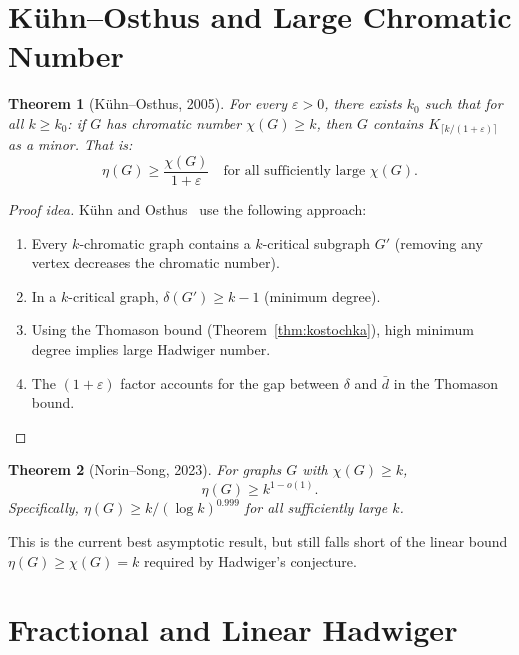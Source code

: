 \documentclass[12pt,a4paper]{amsart}
\newtheorem{theorem}{Theorem}[section]
\theoremstyle{definition}
\theoremstyle{remark}
\begin{document}
\section{Kühn--Osthus and Large Chromatic Number}

\begin{theorem}[Kühn--Osthus, 2005]\label{thm:KO}
For every $\varepsilon > 0$, there exists $k_0$ such that for all $k \geq k_0$:
if $G$ has chromatic number $\chi(G) \geq k$, then $G$ contains $K_{\lceil k/(1+\varepsilon)\rceil}$
as a minor. That is:
\[
  \eta(G) \geq \frac{\chi(G)}{1 + \varepsilon} \quad \text{for all sufficiently large } \chi(G).
\]
\end{theorem}

\begin{proof}[Proof idea]
Kühn and Osthus~\cite{KO05} use the following approach:
\begin{enumerate}[label=(\roman*)]
  \item Every $k$-chromatic graph contains a $k$-critical subgraph $G'$
        (removing any vertex decreases the chromatic number).
  \item In a $k$-critical graph, $\delta(G') \geq k-1$ (minimum degree).
  \item Using the Thomason bound (Theorem~\ref{thm:kostochka}), high minimum
        degree implies large Hadwiger number.
  \item The $(1+\varepsilon)$ factor accounts for the gap between $\delta$ and
        $\bar{d}$ in the Thomason bound.
\end{enumerate}
\end{proof}

\begin{theorem}[Norin--Song, 2023]\label{thm:NS23}
For graphs $G$ with $\chi(G) \geq k$,
\[
  \eta(G) \geq k^{1 - o(1)}.
\]
Specifically, $\eta(G) \geq k / (\log k)^{0.999}$ for all sufficiently large $k$.
\end{theorem}

This is the current best asymptotic result, but still falls short of the linear
bound $\eta(G) \geq \chi(G) = k$ required by Hadwiger's conjecture.

\section{Fractional and Linear Hadwiger}
\end{document}
